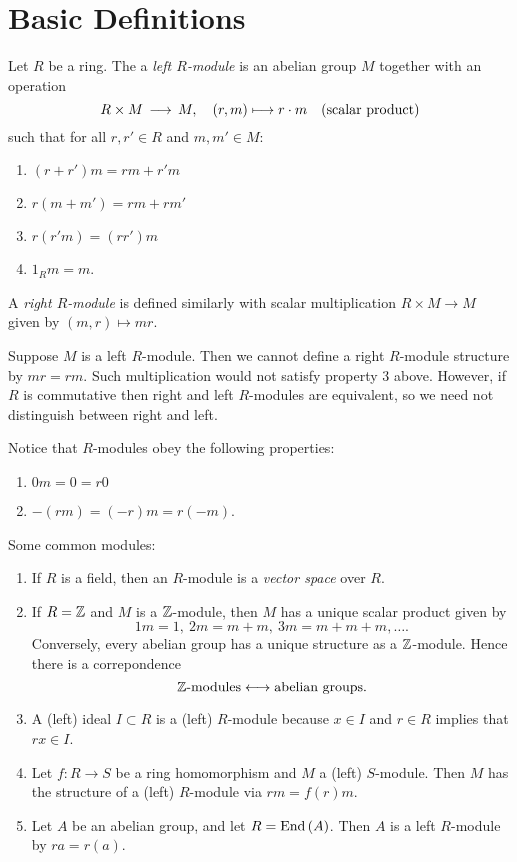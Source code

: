 \section{Basic Definitions}

\begin{dfn}
  Let $R$ be a ring. The a \emph{left $R$-module} is an abelian group $M$ together with an operation
  \[
  R \times M \,\longrightarrow\, M, \quad (r,m) \longmapsto r\cdot m \quad \text{(scalar product)}
  \]
  such that for all $r,r' \in R$ and $m, m' \in M$:
  \begin{enumerate}
  \item $(r + r')m = rm + r'm$
  \item $r(m + m') = rm + rm'$
  \item $r(r'm) = (rr')m$
  \item $1_R m = m$.
  \end{enumerate}
  A \emph{right $R$-module} is defined similarly with scalar multiplication $R \times M \to M$ given by $(m,r) \mapsto mr$.
\end{dfn}

Suppose $M$ is a left $R$-module. Then we cannot define a right $R$-module structure by $mr = r m$. Such multiplication would not satisfy property 3 above. However, if $R$ is commutative then right and left $R$-modules are equivalent, so we need not distinguish between right and left.

Notice that $R$-modules obey the following properties:
\begin{enumerate}
\item $0 m = 0 = r 0$
\item $-(rm) = (-r)m = r(-m)$.
\end{enumerate}

\begin{eg}
  Some common modules:
  \begin{enumerate}
  \item If $R$ is a field, then an $R$-module is a \emph{vector space} over $R$.
  \item If $R = \mathbb{Z}$ and $M$ is a $\mathbb{Z}$-module, then $M$ has a unique scalar product given by
    \[
    1 m = 1,\ 2m = m + m,\ 3m = m + m + m,\ldots.
    \]
    Conversely, every abelian group has a unique structure as a $\mathbb{Z}$-module. Hence there is a correpondence
    \[
    \mathbb{Z} \text{-modules} \longleftrightarrow \text{abelian groups}.
    \]
  \item A (left) ideal $I \subset R$ is a (left) $R$-module because $x \in I$ and $r \in R$ implies that $rx \in I$.
  \item Let $f: R \to S$ be a ring homomorphism and $M$ a (left) $S$-module. Then $M$ has the structure of a (left) $R$-module via $rm = f(r)m$.
  \item Let $A$ be an abelian group, and let $R = \mathrm{End}\,(A)$. Then $A$ is a left $R$-module by $r a = r(a)$.  
  \end{enumerate}
\end{eg}

